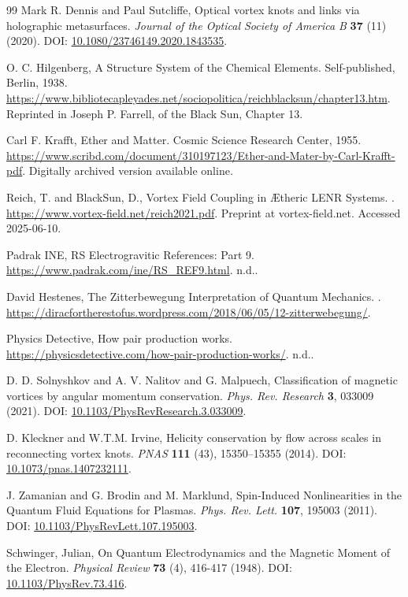 \documentclass[a4paper, aps,preprint,superscriptaddress, 12pt]{revtex4}
\begin{document}
\begin{thebibliography}{99}
Mark R. Dennis and Paul Sutcliffe,
\newblock Optical vortex knots and links via holographic metasurfaces.
\textit{Journal of the Optical Society of America B} \textbf{37} (11) (2020).
\newblock DOI: \href{https://doi.org/10.1080/23746149.2020.1843535}{10.1080/23746149.2020.1843535}.


O. C. Hilgenberg,
\newblock A Structure System of the Chemical Elements.
\newblock Self-published, Berlin, 1938.
\newblock \url{https://www.bibliotecapleyades.net/sociopolitica/reichblacksun/chapter13.htm}.
\newblock Reprinted in Joseph P. Farrell, \emphReich of the Black Sun, Chapter 13.


Carl F. Krafft,
\newblock Ether and Matter.
\newblock Cosmic Science Research Center, 1955.
\newblock \url{https://www.scribd.com/document/310197123/Ether-and-Mater-by-Carl-Krafft-pdf}.
\newblock Digitally archived version available online.


Reich, T. and BlackSun, D.,
\newblock Vortex Field Coupling in Ætheric LENR Systems.
.
\newblock \url{https://www.vortex-field.net/reich2021.pdf}.
\newblock Preprint at vortex-field.net.
\newblock Accessed 2025-06-10.


Padrak INE,
\newblock RS Electrogravitic References: Part 9.
\newblock \url{https://www.padrak.com/ine/RS_REF9.html}.
\newblock n.d..


David Hestenes,
\newblock The Zitterbewegung Interpretation of Quantum Mechanics.
.
\newblock \url{https://diracfortherestofus.wordpress.com/2018/06/05/12-zitterwebegung/}.


Physics Detective,
\newblock How pair production works.
\newblock \url{https://physicsdetective.com/how-pair-production-works/}.
\newblock n.d..


D. D. Solnyshkov and A. V. Nalitov and G. Malpuech,
\newblock Classification of magnetic vortices by angular momentum conservation.
\textit{Phys. Rev. Research} \textbf{3}, 033009 (2021).
\newblock DOI: \href{https://doi.org/10.1103/PhysRevResearch.3.033009}{10.1103/PhysRevResearch.3.033009}.


D. Kleckner and W.T.M. Irvine,
\newblock Helicity conservation by flow across scales in reconnecting vortex knots.
\textit{PNAS} \textbf{111} (43), 15350--15355 (2014).
\newblock DOI: \href{https://doi.org/10.1073/pnas.1407232111}{10.1073/pnas.1407232111}.


J. Zamanian and G. Brodin and M. Marklund,
\newblock Spin-Induced Nonlinearities in the Quantum Fluid Equations for Plasmas.
\textit{Phys. Rev. Lett.} \textbf{107}, 195003 (2011).
\newblock DOI: \href{https://doi.org/10.1103/PhysRevLett.107.195003}{10.1103/PhysRevLett.107.195003}.


Schwinger, Julian,
\newblock On Quantum Electrodynamics and the Magnetic Moment of the Electron.
\textit{Physical Review} \textbf{73} (4), 416-417 (1948).
\newblock DOI: \href{https://doi.org/10.1103/PhysRev.73.416}{10.1103/PhysRev.73.416}.


\end{thebibliography}
\end{document}
